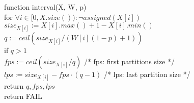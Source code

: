 function interval(X, W, p) \\
\indent for $\forall i \in [0, X.size()): \lnot assigned(X[i])$ \\
\indent \indent $size_{X[i]} := X[i].max()+1-X[i].min()$ \\
\indent \indent $q := ceil(size_{X[i]}/(W[i](1 - p) + 1))$ \\
\indent \indent if $q > 1$ \\
\indent \indent \indent $fps := ceil(size_{X[i]}/q)$ /* fps: first partitions size */\\
\indent \indent \indent $lps := size_{X[i]} - fps \cdot (q-1)$ /* lps: last partition size */\\
\indent \indent \indent return $q, fps, lps$\\
\indent return FAIL\\